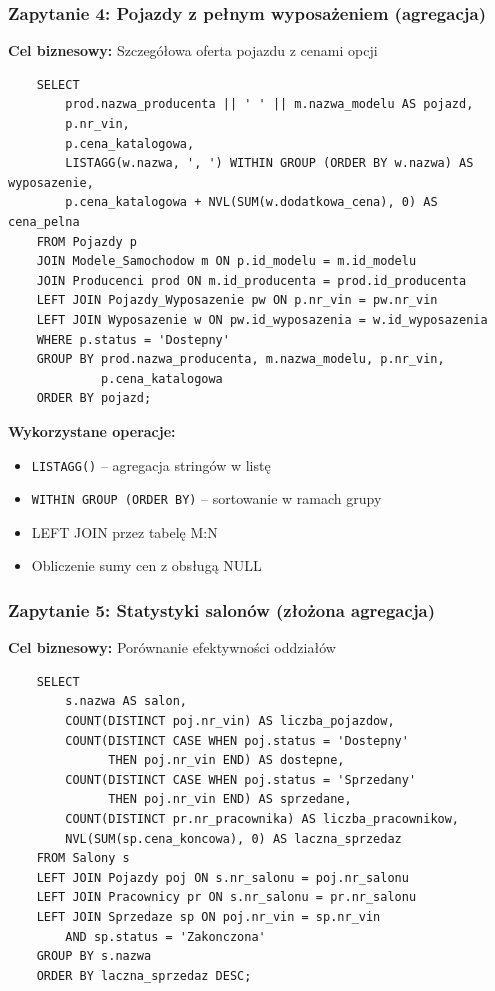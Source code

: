 \documentclass[a4paper,titleauthor]{mwart}
\begin{document}
	\subsubsection{Zapytanie 4: Pojazdy z pełnym wyposażeniem (agregacja)}

	\textbf{Cel biznesowy:} Szczegółowa oferta pojazdu z cenami opcji

	\begin{verbatim}
	SELECT 
		prod.nazwa_producenta || ' ' || m.nazwa_modelu AS pojazd,
		p.nr_vin,
		p.cena_katalogowa,
		LISTAGG(w.nazwa, ', ') WITHIN GROUP (ORDER BY w.nazwa) AS wyposazenie,
		p.cena_katalogowa + NVL(SUM(w.dodatkowa_cena), 0) AS cena_pelna
	FROM Pojazdy p
	JOIN Modele_Samochodow m ON p.id_modelu = m.id_modelu
	JOIN Producenci prod ON m.id_producenta = prod.id_producenta
	LEFT JOIN Pojazdy_Wyposazenie pw ON p.nr_vin = pw.nr_vin
	LEFT JOIN Wyposazenie w ON pw.id_wyposazenia = w.id_wyposazenia
	WHERE p.status = 'Dostepny'
	GROUP BY prod.nazwa_producenta, m.nazwa_modelu, p.nr_vin, 
			 p.cena_katalogowa
	ORDER BY pojazd;
	\end{verbatim}

	\textbf{Wykorzystane operacje:}
	\begin{itemize}
		\item \texttt{LISTAGG()} -- agregacja stringów w listę
		\item \texttt{WITHIN GROUP (ORDER BY)} -- sortowanie w ramach grupy
		\item LEFT JOIN przez tabelę M:N
		\item Obliczenie sumy cen z obsługą NULL
	\end{itemize}

	\subsubsection{Zapytanie 5: Statystyki salonów (złożona agregacja)}

	\textbf{Cel biznesowy:} Porównanie efektywności oddziałów

	\begin{verbatim}
	SELECT 
		s.nazwa AS salon,
		COUNT(DISTINCT poj.nr_vin) AS liczba_pojazdow,
		COUNT(DISTINCT CASE WHEN poj.status = 'Dostepny' 
			  THEN poj.nr_vin END) AS dostepne,
		COUNT(DISTINCT CASE WHEN poj.status = 'Sprzedany' 
			  THEN poj.nr_vin END) AS sprzedane,
		COUNT(DISTINCT pr.nr_pracownika) AS liczba_pracownikow,
		NVL(SUM(sp.cena_koncowa), 0) AS laczna_sprzedaz
	FROM Salony s
	LEFT JOIN Pojazdy poj ON s.nr_salonu = poj.nr_salonu
	LEFT JOIN Pracownicy pr ON s.nr_salonu = pr.nr_salonu
	LEFT JOIN Sprzedaze sp ON poj.nr_vin = sp.nr_vin 
		AND sp.status = 'Zakonczona'
	GROUP BY s.nazwa
	ORDER BY laczna_sprzedaz DESC;
	\end{verbatim}
\end{document}

